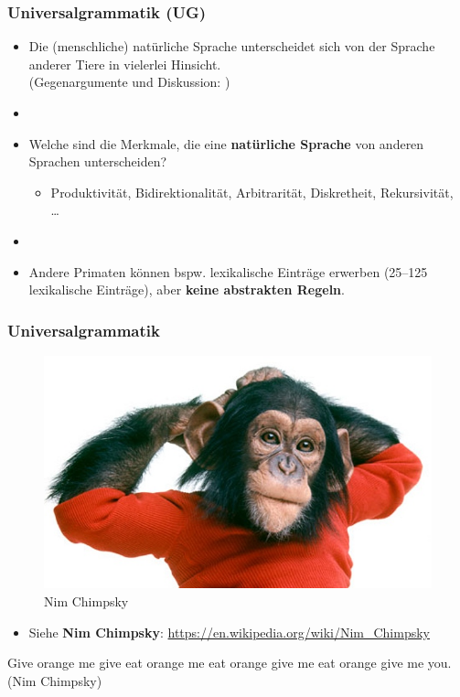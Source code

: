 \begin{frame}
\frametitle{Universalgrammatik (UG)}

\begin{itemize}

	\item Die (menschliche) natürliche Sprache unterscheidet sich von der Sprache anderer Tiere in vielerlei Hinsicht. \citep[vgl. \zB][]{Hockett60x, Pinker95a}\\
	(Gegenargumente und Diskussion: \citealt{Evans&Levinson09a, MuellerS15b})
	\item[]
	\item Welche sind die Merkmale, die eine \textbf{natürliche Sprache} von anderen Sprachen unterscheiden? 
	\begin{itemize}
		\item Produktivität, Bidirektionalität, Arbitrarität, Diskretheit, Rekursivität, \dots\ \citep[vgl.][]{Hockett60x, Luedeling2009}
	\end{itemize}


	\item[]
	\item Andere Primaten können bspw. lexikalische Einträge erwerben (25--125 lexikalische Einträge), aber \textbf{keine abstrakten Regeln}.
\end{itemize}

\end{frame}


\begin{frame}
\frametitle{Universalgrammatik}

\begin{figure}
\centering
	\includegraphics[scale=.26]{material/06nimchimpsky}
	\caption{Nim Chimpsky}
\end{figure}

\begin{itemize}
	\item Siehe \textbf{Nim Chimpsky}: \url{https://en.wikipedia.org/wiki/Nim_Chimpsky}
\end{itemize}

	\ea Give orange me give eat orange me eat orange give me eat orange give me you. \hfill (Nim Chimpsky)
	\z



\end{frame}


